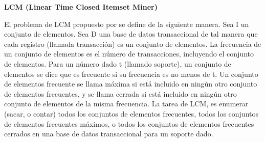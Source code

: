 \textbf{LCM (Linear Time Closed Itemset Miner)}

El problema de LCM propuesto por \cite{uno2005lcm} se define de la siguiente manera.
Sea I un conjunto de elementos. Sea D una base de datos transaccional de tal manera que cada 
registro (llamada transacción) es un conjunto de elementos. La frecuencia de un conjunto de 
elementos es el número de transacciones, incluyendo el conjunto de elementos. Para un número dado t 
(llamado soporte), un conjunto de elementos se dice que es frecuente si su frecuencia es no menos de 
t. Un conjunto de elementos frecuente se llama máxima si está incluido en ningún otro conjunto de 
elementos frecuentes, y se llama cerrada si está incluido en ningún otro conjunto de elementos de la 
misma frecuencia. La tarea de LCM, es enumerar (sacar, o contar) todos los conjuntos de elementos 
frecuentes, todos los conjuntos de elementos frecuentes máximos, o todos los conjuntos de elementos 
frecuentes cerrados en una base de datos transaccional para un soporte dado.